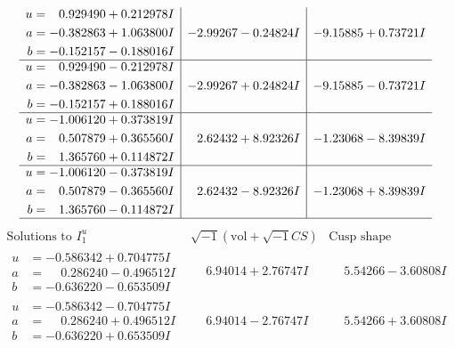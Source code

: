\documentclass[1p]{elsarticle_modified}
\theoremstyle{definition}
\newcommand{\I}{\sqrt{-1}}
\begin{document}
$$\begin{array}{c|c|c}
\begin{aligned}
u &= \phantom{-}0.929490 + 0.212978 I \\
a &= -0.382863 + 1.063800 I \\
b &= -0.152157 - 0.188016 I\end{aligned}
 & -2.99267 - 0.24824 I & -9.15885 + 0.73721 I \\ \hline\begin{aligned}
u &= \phantom{-}0.929490 - 0.212978 I \\
a &= -0.382863 - 1.063800 I \\
b &= -0.152157 + 0.188016 I\end{aligned}
 & -2.99267 + 0.24824 I & -9.15885 - 0.73721 I \\ \hline\begin{aligned}
u &= -1.006120 + 0.373819 I \\
a &= \phantom{-}0.507879 + 0.365560 I \\
b &= \phantom{-}1.365760 + 0.114872 I\end{aligned}
 & \phantom{-}2.62432 + 8.92326 I & -1.23068 - 8.39839 I \\ \hline\begin{aligned}
u &= -1.006120 - 0.373819 I \\
a &= \phantom{-}0.507879 - 0.365560 I \\
b &= \phantom{-}1.365760 - 0.114872 I\end{aligned}
 & \phantom{-}2.62432 - 8.92326 I & -1.23068 + 8.39839 I\\
 \hline 
 \end{array}$$\newpage$$\begin{array}{c|c|c}  
\text{Solutions to }I^u_{1}& \I (\text{vol} + \sqrt{-1}CS) & \text{Cusp shape}\\
 \hline 
\begin{aligned}
u &= -0.586342 + 0.704775 I \\
a &= \phantom{-}0.286240 - 0.496512 I \\
b &= -0.636220 - 0.653509 I\end{aligned}
 & \phantom{-}6.94014 + 2.76747 I & \phantom{-}5.54266 - 3.60808 I \\ \hline\begin{aligned}
u &= -0.586342 - 0.704775 I \\
a &= \phantom{-}0.286240 + 0.496512 I \\
b &= -0.636220 + 0.653509 I\end{aligned}
 & \phantom{-}6.94014 - 2.76747 I & \phantom{-}5.54266 + 3.60808 I \\ \hline\begin{aligned}

\end{aligned}
\end{array}$$
\end{document}
